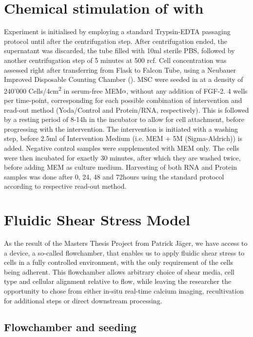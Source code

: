 \section{Chemical stimulation of \Piezo{} with \Yoda}
Experiment is initialised by employing a standard Trypsin-EDTA passaging protocol until after the centrifugation step. After centrifugation ended, the supernatant was discarded, the tube filled with 10ml sterile PBS, followed by another centrifugation step of 5 minutes at 500 rcf. Cell concentration was assessed right after transferring from Flask to Falcon Tube, using a Neubauer Improved Disposable Counting Chamber (). 
MSC were seeded in  at a density of 240'000 Cells/4cm\textsuperscript{2} in serum-free MEM$\alpha$, without any addition of FGF-2. 4 wells per time-point, corresponding for each possible combination of  intervention and read-out method (Yoda/Control and Protein/RNA, respectively). This is followed by a resting period of 8-14h in the incubator to allow for cell attachment, before progressing with the intervention.
The intervention is initiated with a washing step, before 2.5ml of Intervention Medium (i.e. MEM\textalpha{} + 5\textmu{}M \Yoda (Sigma-Aldrich)) is added. Negative control samples were supplemented with MEM\textalpha{} only. The cells were then incubated for exactly 30 minutes, after which they are washed twice, before adding MEM\textalpha{} as culture medium. Harvesting of both RNA and Protein samples was done after 0, 24, 48 and 72hours using the standard protocol according to respective read-out method.\\ 

\section{Fluidic Shear Stress Model}
As the result of the Masters Thesis Project from Patrick Jäger, we have access to a device, a so-called flowchamber, that enables us to apply fluidic shear stress to cells in a fully controlled environment, with the only requirement of the cells being adherent. This flowchamber allows arbitrary choice of shear media, cell type and cellular alignment relative to flow, while leaving the researcher the opportunity to chose from either in-situ real-time calcium imaging, recultivation for additional steps or direct downstream processing.


\subsection{Flowchamber and seeding}
\label{sec:FluidicModel}

